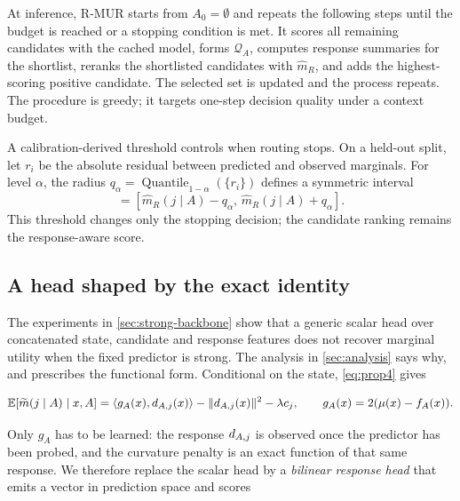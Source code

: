 At inference, R-MUR starts from $A_0=\emptyset$ and repeats the following
steps until the budget is reached or a stopping condition is met. It scores
all remaining candidates with the cached model, forms $\mathcal Q_A$, computes
response summaries for the shortlist, reranks the shortlisted candidates with
$\widehat m_R$, and adds the highest-scoring positive candidate. The selected
set is updated and the process repeats. The procedure is greedy; it targets
one-step decision quality under a context budget.

A calibration-derived threshold controls when routing stops. On a held-out
split, let $r_i$ be the absolute residual between predicted and observed
marginals. For level $\alpha$, the radius
$q_\alpha=\operatorname{Quantile}_{1-\alpha}(\{r_i\})$ defines a symmetric
interval
\begin{equation}
 [L_{A,j},U_{A,j}]
 =
 [\widehat m_R(j\mid A)-q_\alpha,\,
  \widehat m_R(j\mid A)+q_\alpha].
\end{equation}
This threshold changes only the stopping decision; the candidate ranking
remains the response-aware score.

\subsection{A head shaped by the exact identity}
\label{sec:bilinear-head}

The experiments in \cref{sec:strong-backbone} show that a generic scalar head
over concatenated state, candidate and response features does not recover
marginal utility when the fixed predictor is strong. The analysis in
\cref{sec:analysis} says why, and prescribes the functional form. Conditional
on the state, \cref{eq:prop4} gives

\begin{equation}
 \mathbb{E}\!\left[\widetilde{m}(j\mid A)\mid x,A\right]
 =
 \langle g_A(x), d_{A,j}(x)\rangle-\|d_{A,j}(x)\|^2-\lambda c_j ,
 \qquad g_A(x)=2(\mu(x)-f_A(x)).
\end{equation}

Only $g_A$ has to be learned: the response $d_{A,j}$ is observed once the
predictor has been probed, and the curvature penalty is an exact function of
that same response. We therefore replace the scalar head by a \emph{bilinear
response head} that emits a vector in prediction space and scores

